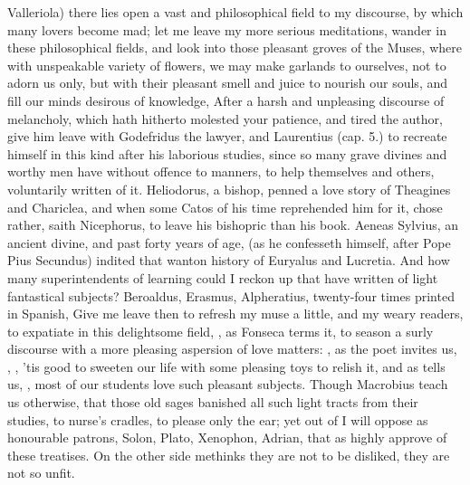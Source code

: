 {Valleriola) there lies open a vast and philosophical field to my
discourse, by which many lovers become mad; let me leave my more
serious meditations, wander in these philosophical fields, and look
into those pleasant groves of the Muses, where with unspeakable variety
of flowers, we may make garlands to ourselves, not to adorn us only,
but with their pleasant smell and juice to nourish our souls, and fill
our minds desirous of knowledge, \etc{} After a harsh and unpleasing
discourse of melancholy, which hath hitherto molested your patience,
and tired the author, give him leave with Godefridus the lawyer,
and Laurentius (cap. 5.) to recreate himself in this kind after his
laborious studies, since so many grave divines and worthy men have
without offence to manners, to help themselves and others, voluntarily
written of it. Heliodorus, a bishop, penned a love story of Theagines
and Chariclea, and when some Catos of his time reprehended him for it,
chose rather, saith Nicephorus, to leave his bishopric than his
book. Aeneas Sylvius, an ancient divine, and past forty years of age,
(as he confesseth himself, after Pope Pius Secundus) indited that
wanton history of Euryalus and Lucretia. And how many superintendents
of learning could I reckon up that have written of light fantastical
subjects? Beroaldus, Erasmus, Alpheratius, twenty-four times printed in
Spanish, \etc{} Give me leave then to refresh my muse a little, and my
weary readers, to expatiate in this delightsome field, , as Fonseca terms it, to  season a surly discourse with a
more pleasing aspersion of love matters: , as
the poet invites us, , \etc{}, 'tis good to sweeten our life
with some pleasing toys to relish it, and as \Pliny{} tells us, , most of our students love such
pleasant subjects. Though Macrobius teach us otherwise,
that those old sages banished all such light tracts from their
studies, to nurse's cradles, to please only the ear; yet out of
\Apuleius I will oppose as honourable patrons, Solon, Plato, 
Xenophon, Adrian, \etc{} that as highly approve of these treatises. On the
other side methinks they are not to be disliked, they are not so unfit.

}
